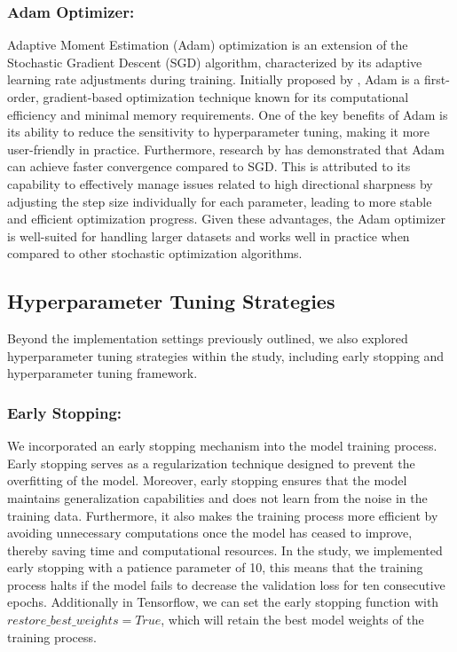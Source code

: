 \documentclass{l4proj}
\begin{document}
\subsubsection{Adam Optimizer:}
Adaptive Moment Estimation (Adam) optimization is an extension of the Stochastic Gradient Descent (SGD) algorithm, characterized by its adaptive learning rate adjustments during training. Initially proposed by \cite{adam_optimizer}, Adam is a first-order, gradient-based optimization technique known for its computational efficiency and minimal memory requirements. One of the key benefits of Adam is its ability to reduce the sensitivity to hyperparameter tuning, making it more user-friendly in practice. Furthermore, research by \cite{toward_understanding_of_adam} has demonstrated that Adam can achieve faster convergence compared to SGD. This is attributed to its capability to effectively manage issues related to high directional sharpness by adjusting the step size individually for each parameter, leading to more stable and efficient optimization progress. Given these advantages, the Adam optimizer is well-suited for handling larger datasets and works well in practice when compared to other stochastic optimization algorithms.

\subsection{Hyperparameter Tuning Strategies}
Beyond the implementation settings previously outlined, we also explored hyperparameter tuning strategies within the study, including early stopping and hyperparameter tuning framework.

\subsubsection{Early Stopping:}
We incorporated an early stopping mechanism into the model training process. Early stopping serves as a regularization technique designed to prevent the overfitting of the model. Moreover, early stopping ensures that the model maintains generalization capabilities and does not learn from the noise in the training data. Furthermore, it also makes the training process more efficient by avoiding unnecessary computations once the model has ceased to improve, thereby saving time and computational resources. In the study, we implemented early stopping with a patience parameter of 10, this means that the training process halts if the model fails to decrease the validation loss for ten consecutive epochs. Additionally in Tensorflow, we can set the early stopping function with $restore\_best\_weights=True$, which will retain the best model weights of the training process.
\end{document}
